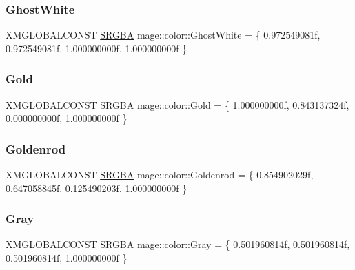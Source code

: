 \hypertarget{namespacemage_1_1color_ae1c43e8ab59914b49570cacb857409cd}{}\label{namespacemage_1_1color_ae1c43e8ab59914b49570cacb857409cd} 
\subsubsection{\texorpdfstring{Ghost\+White}{GhostWhite}}
{\footnotesize\ttfamily X\+M\+G\+L\+O\+B\+A\+L\+C\+O\+N\+ST \hyperlink{structmage_1_1_s_r_g_b_a}{S\+R\+G\+BA} mage\+::color\+::\+Ghost\+White = \{ 0.\+972549081f, 0.\+972549081f, 1.\+000000000f, 1.\+000000000f \}}

\hypertarget{namespacemage_1_1color_a2dd5e925822a435184cfac32f1f1e164}{}\label{namespacemage_1_1color_a2dd5e925822a435184cfac32f1f1e164} 
\subsubsection{\texorpdfstring{Gold}{Gold}}
{\footnotesize\ttfamily X\+M\+G\+L\+O\+B\+A\+L\+C\+O\+N\+ST \hyperlink{structmage_1_1_s_r_g_b_a}{S\+R\+G\+BA} mage\+::color\+::\+Gold = \{ 1.\+000000000f, 0.\+843137324f, 0.\+000000000f, 1.\+000000000f \}}

\hypertarget{namespacemage_1_1color_ae13828a6a1b0cc263b5a9bd822b559ff}{}\label{namespacemage_1_1color_ae13828a6a1b0cc263b5a9bd822b559ff} 
\subsubsection{\texorpdfstring{Goldenrod}{Goldenrod}}
{\footnotesize\ttfamily X\+M\+G\+L\+O\+B\+A\+L\+C\+O\+N\+ST \hyperlink{structmage_1_1_s_r_g_b_a}{S\+R\+G\+BA} mage\+::color\+::\+Goldenrod = \{ 0.\+854902029f, 0.\+647058845f, 0.\+125490203f, 1.\+000000000f \}}

\hypertarget{namespacemage_1_1color_a66089b91c00c11fd66fdb6b957e18c6f}{}\label{namespacemage_1_1color_a66089b91c00c11fd66fdb6b957e18c6f} 
\subsubsection{\texorpdfstring{Gray}{Gray}}
{\footnotesize\ttfamily X\+M\+G\+L\+O\+B\+A\+L\+C\+O\+N\+ST \hyperlink{structmage_1_1_s_r_g_b_a}{S\+R\+G\+BA} mage\+::color\+::\+Gray = \{ 0.\+501960814f, 0.\+501960814f, 0.\+501960814f, 1.\+000000000f \}}

